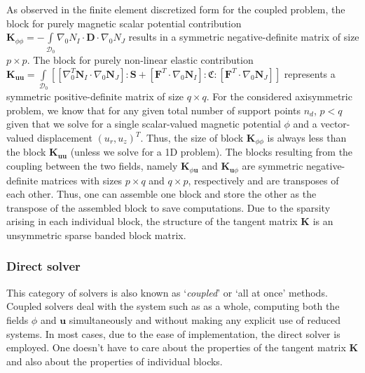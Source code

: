 As observed in the finite element discretized form for the coupled problem, the block for purely magnetic scalar potential contribution $\mathbf{K}_{\phi \phi} = - \int\limits_{\mathcal{D}_0} \nabla_0 N_I \cdot \mathbf{D} \cdot \nabla_0 N_J$ results in a symmetric negative-definite matrix of size $p \times p$. The block for purely non-linear elastic contribution $\mathbf{K}_{\mathbf{u} \mathbf{u}} = \int\limits_{\mathcal{D}_0} \left[ \left[ \nabla_0^T \mathbf{N}_I \cdot \nabla_0 \mathbf{N}_J \right] : \mathbf{S} + \left[ \mathbf{F}^T \cdot \nabla_0 \mathbf{N}_I \right] : \mathfrak{C} : \left[ \mathbf{F}^T \cdot \nabla_0 \mathbf{N}_J \right] \right]$ represents a symmetric positive-definite matrix of size $q \times q$. For the considered axisymmetric problem, we know that for any given total number of support points $n_d$, $p < q$ given that we solve for a single scalar-valued magnetic potential $\phi$ and a vector-valued displacement $(u_r, u_z)^T$. Thus, the size of block $\mathbf{K}_{\phi \phi}$ is always less than the block $\mathbf{K}_{\mathbf{u} \mathbf{u}}$ (unless we solve for a 1D problem). The blocks resulting from the coupling between the two fields, namely $\mathbf{K}_{\phi \mathbf{u}}$ and $\mathbf{K}_{\mathbf{u} \phi}$ are symmetric negative-definite matrices with sizes $p \times q$ and $q \times p$, respectively and are transposes of each other. Thus, one can assemble one block and store the other as the transpose of the assembled block to save computations. Due to the sparsity arising in each individual block, the structure of the tangent matrix $\mathbf{K}$ is an unsymmetric sparse banded block matrix.\par 

\subsubsection{Direct solver}
This category of solvers is also known as `\textit{coupled}' or `all at once' methods. Coupled solvers deal with the system such as  as a whole, computing both the fields $\phi$ and $\mathbf{u}$ simultaneously and without making any explicit use of reduced systems. In most cases, due to the ease of implementation, the direct solver is employed. One doesn't have to care about the properties of the tangent matrix $\mathbf{K}$ and also about the properties of individual blocks. \par 

